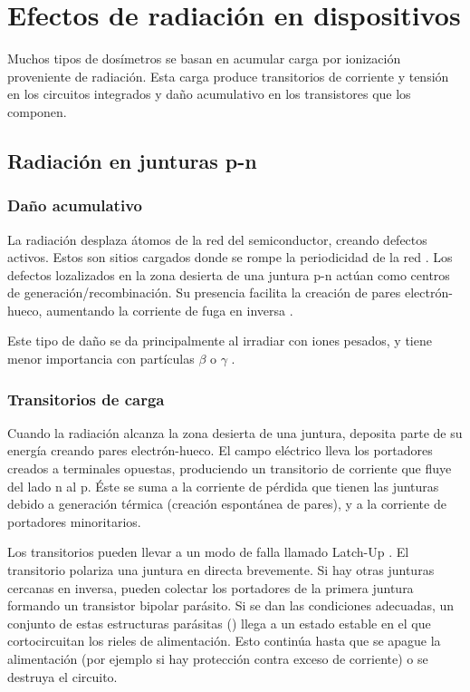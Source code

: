 \section{Efectos de radiación en dispositivos}
Muchos tipos de dosímetros se basan en acumular 
carga por ionización proveniente de radiación.
Esta carga produce transitorios de corriente y tensión en los circuitos 
integrados y daño acumulativo en los transistores que los componen.

\subsection{Radiación en junturas p-n}
\subsubsection{Daño acumulativo}
La radiación desplaza átomos de la red del semiconductor, 
creando defectos activos.
Estos son sitios cargados donde se rompe la periodicidad de la red
\cite{iniewski_radiation_2011}.
Los defectos lozalizados en la zona desierta de una juntura p-n
actúan como centros de generación/recombinación.
Su presencia facilita la creación de pares electrón-hueco, 
aumentando la corriente de fuga en inversa
.

Este tipo de daño se da principalmente al irradiar con iones pesados,
y tiene menor importancia con partículas $\beta$ o $\gamma$
\cite{knoll_radiation_2010}%
\cite{liu_electron_1971}.
\subsubsection{Transitorios de carga}
Cuando la radiación alcanza la zona desierta de una juntura,
deposita parte de su energía creando pares electrón-hueco.
El campo eléctrico lleva los portadores creados a terminales opuestas,
produciendo un transitorio de corriente que fluye del lado n al p.
Éste se suma a la corriente de pérdida que tienen las junturas
debido a generación térmica (creación espontánea de pares),
y a la corriente de portadores minoritarios.

Los transitorios pueden llevar a un modo de falla llamado Latch-Up
\cite{gregory_latch-up_1973}.
El transitorio polariza una juntura en directa brevemente.
Si hay otras junturas cercanas en inversa,
pueden colectar los portadores de la primera juntura 
formando un transistor bipolar parásito.
Si se dan las condiciones adecuadas,
un conjunto de estas estructuras parásitas ()
llega a un estado estable
en el que cortocircuitan los rieles de alimentación.
Esto continúa hasta que se apague la alimentación 
(por ejemplo si hay protección contra exceso de corriente)
o se destruya el circuito.
